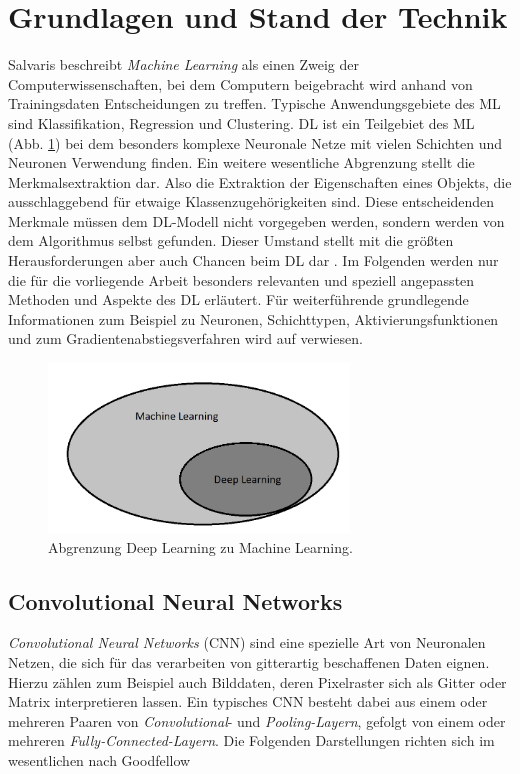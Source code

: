 \section{Grundlagen und Stand der Technik}

Salvaris beschreibt \textit{Machine Learning} als einen Zweig der Computerwissenschaften, bei dem Computern beigebracht wird anhand von Trainingsdaten Entscheidungen zu treffen. Typische Anwendungsgebiete des ML sind Klassifikation, Regression und Clustering. DL ist ein Teilgebiet des ML (Abb. \ref{dlmlunterschied}) bei dem besonders komplexe Neuronale Netze mit vielen Schichten und Neuronen Verwendung finden. Ein weitere wesentliche Abgrenzung stellt die Merkmalsextraktion dar. Also die Extraktion der Eigenschaften eines Objekts, die ausschlaggebend für etwaige Klassenzugehörigkeiten sind. Diese entscheidenden Merkmale müssen dem DL-Modell nicht vorgegeben werden, sondern werden von dem Algorithmus selbst gefunden. Dieser Umstand stellt mit die größten Herausforderungen aber auch Chancen beim DL dar \cite[S.32-47]{dlazure2019}.  Im Folgenden werden nur die für die vorliegende Arbeit besonders relevanten und speziell angepassten Methoden und Aspekte des DL erläutert. Für weiterführende grundlegende Informationen zum Beispiel zu Neuronen, Schichttypen, Aktivierungsfunktionen und zum Gradientenabstiegsverfahren wird auf \cite{dlbook2018} verwiesen. 
\begin{figure}[!h]
  \centering
  \includegraphics[width=8cm]{mldlunterschied.png}
  \caption{Abgrenzung Deep Learning zu Machine Learning.}
  \label{dlmlunterschied}
\end{figure}

\subsection{Convolutional Neural Networks}

\textit{Convolutional Neural Networks} (CNN) sind eine spezielle Art von Neuronalen Netzen, die sich für das verarbeiten von gitterartig beschaffenen Daten eignen. Hierzu zählen zum Beispiel auch Bilddaten, deren Pixelraster sich als Gitter oder Matrix interpretieren lassen. Ein typisches CNN besteht dabei aus einem oder mehreren Paaren von \textit{Convolutional}- und \textit{Pooling-Layern}, gefolgt von einem oder mehreren \textit{Fully-Connected-Layern}. Die Folgenden Darstellungen richten sich im wesentlichen nach Goodfellow \cite[S.326-366]{Goodfellow-et-al-2016}
